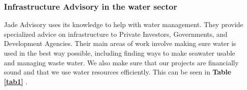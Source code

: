 \subsubsection*{Infrastructure Advisory in the water sector}
Jade Advisory uses its knowledge to help with water management. They provide specialized advice on infrastructure to Private Investors, Governments, and Development Agencies. Their main areas of work involve making sure water is used in the best way possible, including finding ways to make seawater usable and managing waste water. We also make sure that our projects are financially sound and that we use water resources efficiently. This can be seen in \textbf{Table \ref{tab1} }.%
